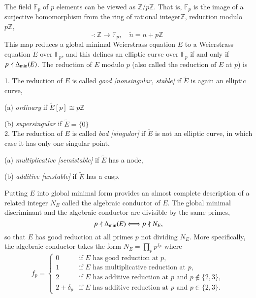 The field $\mathbb{F}_p$ of $p$ elements can be viewed as $\mathbb{Z}/p\mathbb{Z}$. That is, $\mathbb{F}_p$
is the image of a surjective homomorphism from the ring of rational integer$\mathbb{Z}$, reduction modulo $p\mathbb{Z}$,
\begin{equation*}
    \tilde{ }: \mathbb{Z}\longrightarrow \mathbb{F}_p,\quad \tilde{n}=n+p\mathbb{Z}
\end{equation*} 
This map reduces a global minimal Weierstrass equation $E$ to a Weierstrass equation $\tilde{E}$ over 
$\mathbb{F}_p$, and this defines an elliptic curve over $\mathbb{F}_p$ if and only if $p\nmid \Delta_{\rm min}(E)$.
The reduction of $E$ modulo $p$ (also called the reduction of $E$ at $p$) is 
\begin{definition}
    1. The reduction of $E$ is called \textit{good [nonsingular, stable]} if $\tilde{E}$ is again an elliptic curve, \par
    (a) \textit{ordinary } if $\tilde{E}[p]\cong p\mathbb{Z}$\par
    (b) \textit{supersingular} if $\tilde{E}=\{0\}$\\
    2. The reduction of $E$ is called \textit{bad [singular]} if $\tilde{E}$ is not an elliptic curve, in which 
    case it has only one singular point,\par
    (a) \textit{multiplicative [semistable]} if $\tilde{E}$ has a node,\par
    (b) \textit{additive [unstable]} if $\tilde{E}$ has a cusp.  
\end{definition}
Putting $E$ into global minimal form provides an almost complete description of a related integer $N_E$ called the algebraic
conductor of $E$. The global minimal discriminant and the algebraic conductor are divisible by the same primes,
\begin{equation*}
    p\nmid \Delta_{\rm min}(E) \Longleftrightarrow p\nmid N_E,
\end{equation*}
so that $E$ has good reduction at all primes $p$ not dividing $N_E$. More specifically, the algebraic conductor takes 
the form $N_E=\prod_p p^{f_p}$ where
\begin{equation*}
    f_p= \begin{cases}
    0 & \text{if $E$ has good reduction at $p$,}\\
    1 & \text{if $E$ has multiplicative reduction at $p$,}\\
    2 & \text{if $E$ has additive reduction at $p$ and $p\notin \{2,3\}$,}\\
    2+\delta_p & \text{if $E$ has additive reduction at $p$ and $p\in \{2,3\}$. }
    \end{cases}
\end{equation*}

